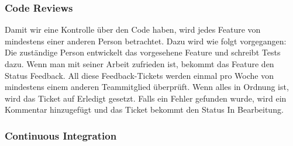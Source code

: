 \documentclass[a4,12pt]{scrartcl}
\begin{document}
\subsubsection{Code Reviews}


Damit wir eine Kontrolle über den Code haben, wird jedes Feature von mindestens einer anderen Person betrachtet.
Dazu wird wie folgt vorgegangen: \\
Die zuständige Person entwickelt das vorgesehene Feature und schreibt Tests dazu.
Wenn man mit seiner Arbeit zufrieden ist, bekommt das Feature den Status Feedback.
All diese Feedback-Tickets werden einmal pro Woche von mindestens einem anderen Teammitglied überprüft.
Wenn alles in Ordnung ist, wird das Ticket auf Erledigt gesetzt.
Falls ein Fehler gefunden wurde, wird ein Kommentar hinzugefügt und das Ticket bekommt den Status In Bearbeitung.

\subsubsection{Continuous Integration}
\end{document}
